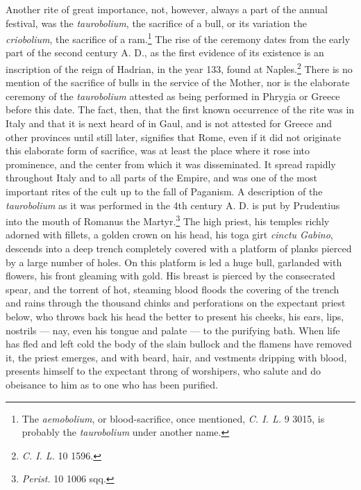 \documentclass[a4paper, 11pt, oneside, polutonikogreek, english]{article}
\begin{document}
Another rite of great importance, not, however, always a part of the annual festival, was the \emph{taurobolium}, the sacrifice of a bull, or its variation the \emph{criobolium}, the sacrifice of a ram.\footnote{The \emph{aemobolium}, or blood-sacrifice, once mentioned, \emph{C. I. L.} 9 3015, is probably the \emph{taurobolium} under another name.} The rise of the ceremony dates from the early part of the second century A. D., as the first evidence of its existence is an inscription of the reign of Hadrian, in the year 133, found at Naples.\footnote{\emph{C. I. L.} 10 1596.} There is no mention of the sacrifice of bulls in the service of the Mother, nor is the elaborate ceremony of the \emph{taurobolium} attested as being performed in Phrygia or Greece before this date. The fact, then, that the first known occurrence of the rite was in Italy and that it is next heard of in Gaul, and is not attested for Greece and other provinces until still later, signifies that Rome, even if it did not originate this elaborate form of sacrifice, was at least the place where it rose into prominence, and the center from which it was disseminated. It spread rapidly throughout Italy and to all parts of the Empire, and was one of the most important rites of the cult up to the fall of Paganism. A description of the \emph{taurobolium} as it was performed in the 4th century A. D. is put by Prudentius into the mouth of Romanus the Martyr.\footnote{\emph{Perist.} 10 1006 sqq.} The high priest, his temples richly adorned with fillets, a golden crown on his head, his toga girt \emph{cinctu Gabino}, descends into a deep trench completely covered with a platform of planks pierced by a large number of holes. On this platform is led a huge bull, garlanded with flowers, his front gleaming with gold. His breast is pierced by the consecrated spear, and the torrent of hot, steaming blood floods the covering of the trench and rains through the thousand chinks and perforations on the expectant priest below, who throws back his head the better to present his cheeks, his ears, lips, nostrils --- nay, even his tongue and palate --- to the purifying bath. When life has fled and left cold the body of the slain bullock and the flamens have removed it, the priest emerges, and with beard, hair, and vestments dripping with blood, presents himself to the expectant throng of worshipers, who salute and do obeisance to him as to one who has been purified.
\end{document}
